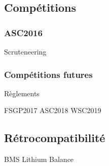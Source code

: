 \subsection{Compétitions}


\subsubsection{ASC2016}

Scruteneering

\subsubsection{Compétitions futures}

Règlements


FSGP2017
ASC2018
WSC2019



\subsection{Rétrocompatibilité}



BMS Lithium Balance

%
%
%
%

